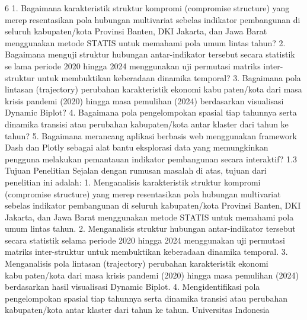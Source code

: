 6
1. Bagaimana karakteristik struktur kompromi (compromise structure) yang merepresentasikan pola hubungan multivariat sebelas indikator pembangunan di seluruh
kabupaten/kota Provinsi Banten, DKI Jakarta, dan Jawa Barat menggunakan metode
STATIS untuk memahami pola umum lintas tahun?
2. Bagaimana menguji struktur hubungan antar-indikator tersebut secara statistik selama periode 2020 hingga 2024 menggunakan uji permutasi matriks inter-struktur
untuk membuktikan keberadaan dinamika temporal?
3. Bagaimana pola lintasan (trajectory) perubahan karakteristik ekonomi kabupaten/kota dari masa krisis pandemi (2020) hingga masa pemulihan (2024)
berdasarkan visualisasi Dynamic Biplot?
4. Bagaimana pola pengelompokan spasial tiap tahunnya serta dinamika transisi atau
perubahan kabupaten/kota antar klaster dari tahun ke tahun?
5. Bagaimana merancang aplikasi berbasis web menggunakan framework Dash dan
Plotly sebagai alat bantu eksplorasi data yang memungkinkan pengguna melakukan
pemantauan indikator pembangunan secara interaktif?
1.3 Tujuan Penelitian
Sejalan dengan rumusan masalah di atas, tujuan dari penelitian ini adalah:
1. Menganalisis karakteristik struktur kompromi (compromise structure) yang merepresentasikan pola hubungan multivariat sebelas indikator pembangunan di seluruh
kabupaten/kota Provinsi Banten, DKI Jakarta, dan Jawa Barat menggunakan metode
STATIS untuk memahami pola umum lintas tahun.
2. Menganalisis struktur hubungan antar-indikator tersebut secara statistik selama
periode 2020 hingga 2024 menggunakan uji permutasi matriks inter-struktur untuk
membuktikan keberadaan dinamika temporal.
3. Menganalisis pola lintasan (trajectory) perubahan karakteristik ekonomi kabupaten/kota dari masa krisis pandemi (2020) hingga masa pemulihan (2024)
berdasarkan hasil visualisasi Dynamic Biplot.
4. Mengidentifikasi pola pengelompokan spasial tiap tahunnya serta dinamika transisi
atau perubahan kabupaten/kota antar klaster dari tahun ke tahun.
Universitas Indonesia

